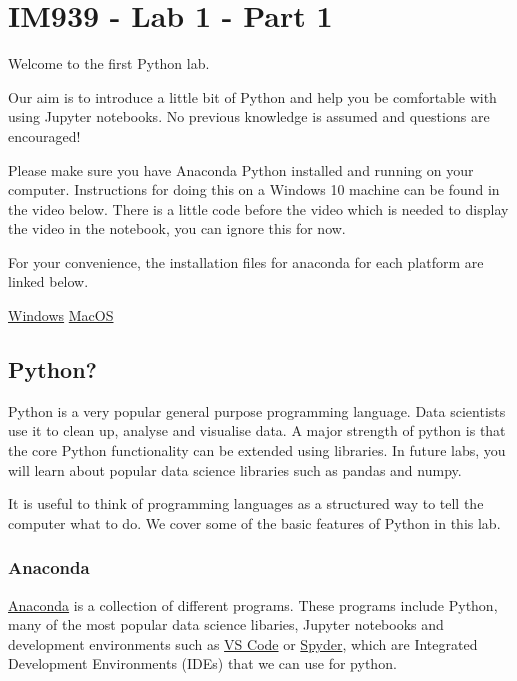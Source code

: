 \documentclass[
  letterpaper,
  DIV=11,
  numbers=noendperiod]{scrreprt}
\begin{document}

\hypertarget{im939---lab-1---part-1}{%
\chapter{IM939 - Lab 1 - Part 1}\label{im939---lab-1---part-1}}

Welcome to the first Python lab.

Our aim is to introduce a little bit of Python and help you be
comfortable with using Jupyter notebooks. No previous knowledge is
assumed and questions are encouraged!

Please make sure you have Anaconda Python installed and running on your
computer. Instructions for doing this on a Windows 10 machine can be
found in the video below. There is a little code before the video which
is needed to display the video in the notebook, you can ignore this for
now.

For your convenience, the installation files for anaconda for each
platform are linked below.

\href{https://repo.anaconda.com/archive/Anaconda3-2020.07-Windows-x86_64.exe}{Windows}
\href{https://repo.anaconda.com/archive/Anaconda3-2020.07-MacOSX-x86_64.pkg}{MacOS}

\hypertarget{python}{%
\section{Python?}\label{python}}

Python is a very popular general purpose programming language. Data
scientists use it to clean up, analyse and visualise data. A major
strength of python is that the core Python functionality can be extended
using libraries. In future labs, you will learn about popular data
science libraries such as pandas and numpy.

It is useful to think of programming languages as a structured way to
tell the computer what to do. We cover some of the basic features of
Python in this lab.

\hypertarget{anaconda}{%
\subsection{Anaconda}\label{anaconda}}

\href{https://anaconda.org/}{Anaconda} is a collection of different
programs. These programs include Python, many of the most popular data
science libaries, Jupyter notebooks and development environments such as
\href{https://code.visualstudio.com/}{VS Code} or
\href{https://www.spyder-ide.org/}{Spyder}, which are Integrated
Development Environments (IDEs) that we can use for python.
\end{document}
